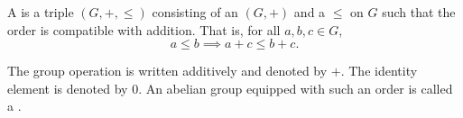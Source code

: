 \begin{definition} \label{definition:totally_ordered_abelian_group}
A  is a triple $(G, +, \leq)$ consisting of an  $(G, +)$ and a  $\leq$ on $G$ such that the order is compatible with addition. That is, for all $a, b, c \in G$,
$$a \leq b \implies a + c \leq b + c.$$

The group operation is written additively and denoted by $+$. The identity element is denoted by $0$. An abelian group equipped with such an order is called a .
\end{definition}
